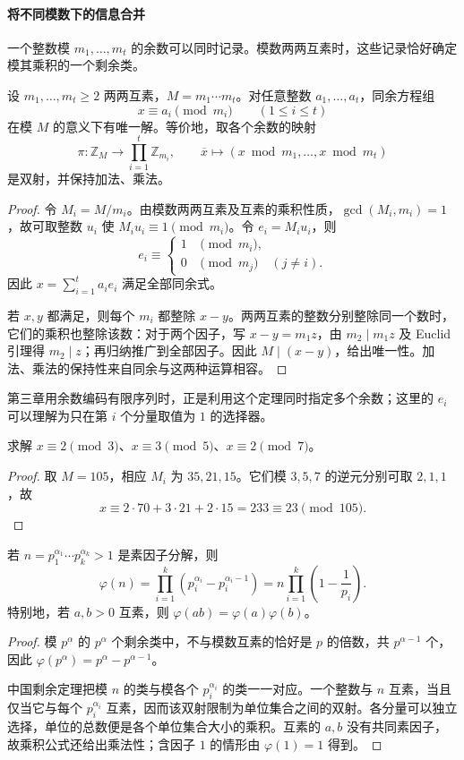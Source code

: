 \documentclass[lang=cn,a4paper,fontset=none,zihao=false,10pt,openany,twoside]{beautybook}
\numberwithin{algorithm}{chapter}
\begin{document}
\paragraph{将不同模数下的信息合并}
一个整数模 $m_1,\ldots,m_t$ 的余数可以同时记录。模数两两互素时，这些记录恰好确定模其乘积的一个剩余类。
\begin{theorem}[中国剩余定理]\label{thm:crt}
设 $m_1,\ldots,m_t\ge2$ 两两互素，$M=m_1\cdots m_t$。对任意整数 $a_1,\ldots,a_t$，同余方程组
\[
 x\equiv a_i\pmod{m_i}\qquad(1\le i\le t)
\]
在模 $M$ 的意义下有唯一解。等价地，取各个余数的映射
\[
 \pi:\mathbb Z_M\longrightarrow\prod_{i=1}^t\mathbb Z_{m_i},
 \qquad \overline x\longmapsto
 (x\bmod m_1,\ldots,x\bmod m_t)
\]
是双射，并保持加法、乘法。
\end{theorem}
\begin{proof}
令 $M_i=M/m_i$。由模数两两互素及互素的乘积性质，$\gcd(M_i,m_i)=1$，故可取整数 $u_i$ 使 $M_i u_i\equiv1\pmod{m_i}$。令 $e_i=M_i u_i$，则
\[
 e_i\equiv\begin{cases}1&\pmod{m_i},\\0&\pmod{m_j}\quad(j\ne i).\end{cases}
\]
因此 $x=\sum_{i=1}^t a_i e_i$ 满足全部同余式。

若 $x,y$ 都满足，则每个 $m_i$ 都整除 $x-y$。两两互素的整数分别整除同一个数时，它们的乘积也整除该数：对于两个因子，写 $x-y=m_1z$，由 $m_2\mid m_1z$ 及 Euclid 引理得 $m_2\mid z$；再归纳推广到全部因子。因此 $M\mid(x-y)$，给出唯一性。加法、乘法的保持性来自同余与这两种运算相容。
\end{proof}
第三章用余数编码有限序列时，正是利用这个定理同时指定多个余数；这里的 $e_i$ 可以理解为只在第 $i$ 个分量取值为 $1$ 的选择器。

\begin{example}
求解 $x\equiv2\pmod3$、$x\equiv3\pmod5$、$x\equiv2\pmod7$。
\end{example}
\begin{proof}
取 $M=105$，相应 $M_i$ 为 $35,21,15$。它们模 $3,5,7$ 的逆元分别可取 $2,1,1$，故
\[
 x\equiv2\cdot70+3\cdot21+2\cdot15
 =233\equiv23\pmod{105}.
\]
\end{proof}

\begin{proposition}
若 $n=p_1^{\alpha_1}\cdots p_k^{\alpha_k}>1$ 是素因子分解，则
\[
 \varphi(n)=\prod_{i=1}^k(p_i^{\alpha_i}-p_i^{\alpha_i-1})
 =n\prod_{i=1}^k\left(1-\frac1{p_i}\right).
\]
特别地，若 $a,b>0$ 互素，则 $\varphi(ab)=\varphi(a)\varphi(b)$。
\end{proposition}
\begin{proof}
模 $p^\alpha$ 的 $p^\alpha$ 个剩余类中，不与模数互素的恰好是 $p$ 的倍数，共 $p^{\alpha-1}$ 个，因此
$\varphi(p^\alpha)=p^\alpha-p^{\alpha-1}$。

中国剩余定理把模 $n$ 的类与模各个 $p_i^{\alpha_i}$ 的类一一对应。一个整数与 $n$ 互素，当且仅当它与每个 $p_i^{\alpha_i}$ 互素，因而该双射限制为单位集合之间的双射。各分量可以独立选择，单位的总数便是各个单位集合大小的乘积。互素的 $a,b$ 没有共同素因子，故乘积公式还给出乘法性；含因子 $1$ 的情形由 $\varphi(1)=1$ 得到。
\end{proof}
\end{document}
